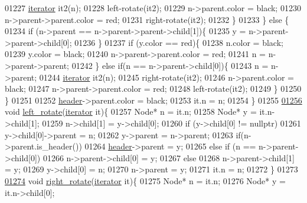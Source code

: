 \begin{DoxyCode}
01227         \hyperlink{classaed2_1_1iterator}{iterator} it2(n);
01228         left-rotate(it2);
01229         n->parent.color = black;
01230         n->parent->parent.color = red;
01231         right-rotate(it2);
01232         \}
01233     \} \textcolor{keywordflow}{else} \{
01234         \textcolor{keywordflow}{if} (n->parent == n->parent->parent->child[1])\{
01235         y = n->parent->parent->child[0];
01236     \}
01237     \textcolor{keywordflow}{if} (y.color == red)\{
01238         n.color = black;
01239         y.color = black;
01240         n->parent->parent.color = red;
01241         n = n->parent->parent;
01242     \} \textcolor{keywordflow}{else} \textcolor{keywordflow}{if}(n == n->parent->child[0])\{
01243         n = n->parent;
01244         \hyperlink{classaed2_1_1iterator}{iterator} it2(n);
01245         right-rotate(it2);
01246         n->parent.color = black;
01247         n->parent->parent.color = red;
01248         left-rotate(it2);
01249     \}
01250 \}
01251 
01252     \hyperlink{classaed2_1_1map_a92d93f905c8ad73fba18fdc7e8915cce_a92d93f905c8ad73fba18fdc7e8915cce}{header}->parent.color = black;
01253     it.n = n;
01254 \}
01255 
\hypertarget{map2_8h_source_l01256}{}\hyperlink{classaed2_1_1map_a1f4b383ece3e22680802d27aa11b623a_a1f4b383ece3e22680802d27aa11b623a}{01256} \textcolor{keywordtype}{void} \hyperlink{classaed2_1_1map_a1f4b383ece3e22680802d27aa11b623a_a1f4b383ece3e22680802d27aa11b623a}{left_rotate}(\hyperlink{classaed2_1_1iterator}{iterator} it)\{
01257     Node* n = it.n;
01258     Node* y = it.n->child[1];
01259     n->child[1] = y->child[0];
01260     \textcolor{keywordflow}{if} (y->child[0] != \textcolor{keyword}{nullptr})
01261         y->child[0]->parent = n;
01262     y->parent = n->parent;
01263     \textcolor{keywordflow}{if}(n->parent.is\_header())
01264         \hyperlink{classaed2_1_1map_a92d93f905c8ad73fba18fdc7e8915cce_a92d93f905c8ad73fba18fdc7e8915cce}{header}->parent = y;
01265     \textcolor{keywordflow}{else} if (n == n->parent->child[0])
01266         n->parent->child[0] = y;
01267     \textcolor{keywordflow}{else}
01268         n->parent->child[1] = y;
01269     y->child[0] = n;
01270     n->parent = y;
01271     it.n = n;
01272 \}
01273 
\hypertarget{map2_8h_source_l01274}{}\hyperlink{classaed2_1_1map_af339eb8e0af78bc07ad55ddd97938ee7_af339eb8e0af78bc07ad55ddd97938ee7}{01274} \textcolor{keywordtype}{void} \hyperlink{classaed2_1_1map_af339eb8e0af78bc07ad55ddd97938ee7_af339eb8e0af78bc07ad55ddd97938ee7}{right_rotate}(\hyperlink{classaed2_1_1iterator}{iterator} it)\{
01275     Node* n = it.n;
01276     Node* y = it.n->child[0];

\end{DoxyCode}
